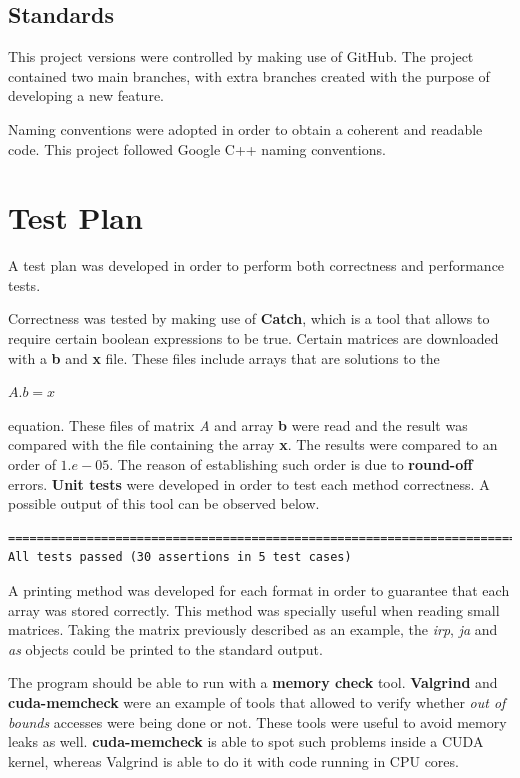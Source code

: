 \documentclass[12pt]{article}
\begin{document}
\subsection*{Standards}

\par This project versions were controlled by making use of GitHub. The project contained two main branches, with extra branches created with the purpose of developing a new feature.
\par Naming conventions were adopted in order to obtain a coherent and readable code. This project followed Google C++ naming conventions. 




\section*{Test Plan}
\par A test plan was developed in order to perform both correctness and performance tests. 
\par Correctness was tested by making use of \textbf{Catch}, which is a tool that allows to require certain boolean expressions to be true. Certain matrices are downloaded with a \textbf{b} and \textbf{x} file. These files include arrays that are solutions to the
\begin{center}
$A . b = x$
\end{center}
equation. These files of matrix \textit{A} and array \textbf{b} were read and the result was compared with the file containing the array \textbf{x}. The results were compared to an order of $1.e-05$. The reason of establishing such order is due to \textbf{round-off} errors. \textbf{Unit tests} were developed in order to test each method correctness. A possible output of this tool can be observed below.
\begin{lstlisting}[style=tests]
=======================================================================
All tests passed (30 assertions in 5 test cases)
\end{lstlisting}
\par A printing method was developed for each format in order to guarantee that each array was stored correctly. This method was specially useful when reading small matrices. Taking the matrix previously described as an example, the \textit{irp}, \textit{ja} and \textit{as} objects could be printed to the standard output. 
\par The program should be able to run with a \textbf{memory check} tool. \textbf{Valgrind} and \textbf{cuda-memcheck} were an example of tools that allowed to verify whether \textit{out of bounds} accesses were being done or not. These tools were useful to avoid memory leaks as well. \textbf{cuda-memcheck} is able to spot such problems inside a CUDA kernel, whereas Valgrind is able to do it with code running in CPU cores.
\end{document}
